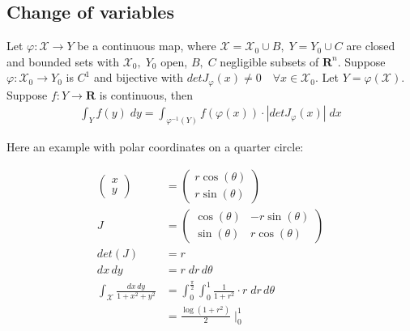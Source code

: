 \documentclass[8pt]{extarticle}
\newcommand{\R}{{\mathbb R}}
\newcommand{\X}{{\mathcal X}}
\newcommand{\ra}{{\rightarrow}}
\def\R{\mathbf{R}}
\begin{document}
\begin{multicols*}{3}
  \subsection{Change of variables}
  Let $\varphi: \X \ra Y$ be a continuous map, where
  $\X = \X_0 \cup B, \; Y = Y_0 \cup C$ are closed and bounded
  sets with $\X_0,\; Y_0$ open, $B, \; C$ negligible subsets of $\R^n$.
  Suppose $\varphi: \X_0 \ra Y_0$ is $C^1$ and bijective with
  $det J_\varphi(x) \neq 0 \quad \forall x \in \X_0$. Let $Y = \varphi(\X)$.
  Suppose $f: Y \ra \R$ is continuous, then
  \begin{align*}
    \int_Y f(y) \; dy = \int_{\varphi^{-1}(Y)} f(\varphi(x)) \cdot |det J_\varphi(x) | \; dx
  \end{align*}
\begin{tcolorbox}[colback=blue!5!white,colframe=blue!75!black]
  Here an example with polar coordinates on a quarter circle:

  \begin{align*}
    \begin{pmatrix}
      x \\
      y
    \end{pmatrix}
                                           & =
    \begin{pmatrix}
      r \cos(\theta) \\
      r \sin(\theta)
    \end{pmatrix}                                                                                            \\
    J                                      & =
    \begin{pmatrix}
      \cos(\theta) & -r \sin(\theta) \\
      \sin(\theta) & r \cos(\theta)
    \end{pmatrix}                                                                                            \\
    det(J)                                 & = r                                                                          \\
    dx \, dy                               & = r \; dr \, d\theta                                                         \\
    \int_\X \frac{dx \, dy}{1 + x^2 + y^2} & = \int_0^{\frac{\pi}{2}} \int_0^1 \frac{1}{1 + r^2} \cdot r \; dr \, d\theta \\
                                           & = \frac{\log(1 + r^2)}{2} \; \Big |_0^1
  \end{align*}


\end{tcolorbox}
\end{multicols*}
\end{document}
